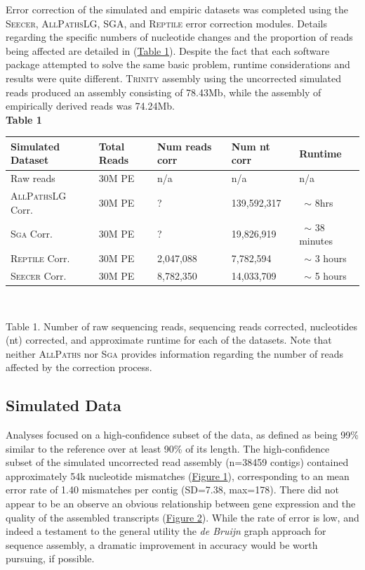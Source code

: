 \documentclass[11pt]{article}
\begin{document}
\noindent
Error correction of the simulated and empiric datasets was completed using the \textsc{Seecer}, \textsc{AllPathsLG}, \textsc{SGA}, and \textsc{Reptile} error correction modules.  Details regarding the specific numbers of nucleotide changes and the proportion of reads being affected are detailed in (\hyperlink{Table 1}{Table 1}). Despite the fact that each software package attempted to solve the same basic problem, runtime considerations and results were quite different. \textsc{Trinity} assembly using the uncorrected simulated reads produced an assembly consisting of 78.43Mb, while the assembly of empirically derived reads was 74.24Mb.  \\

\noindent
\textbf{\hypertarget{Table 1}{Table 1}} \\
\begin{center}
    \begin{tabular}{ | l | l | l  | l | l |}
    \hline
    Simulated Dataset &  Total Reads & Num reads corr & Num  nt corr & Runtime  \\ \hline
    Raw reads & 30M PE & n/a & n/a & n/a \\ \hline
    \textsc{AllPathsLG} Corr. & 30M PE & ? & 139,592,317 & \ $\sim$ 8hrs \\ \hline
    \textsc{Sga} Corr. & 30M PE & ? & 19,826,919 & \ $\sim$ 38 minutes \\ \hline
    \textsc{Reptile} Corr. & 30M PE & 2,047,088 & 7,782,594 & \ $\sim$ 3 hours \\ \hline
     \textsc{Seecer} Corr. & 30M PE & 8,782,350 & 14,033,709 & \ $\sim$ 5 hours \\ \hline
       \end{tabular}
\\
\end{center}
\noindent
\begin{changemargin}{2cm}{2cm}
Table 1. Number of raw sequencing reads, sequencing reads corrected, nucleotides (nt) corrected, and approximate runtime for each of the datasets. Note that neither \textsc{AllPaths} nor \textsc{Sga} provides information regarding the number of reads affected by the correction process. 
\end{changemargin}

\subsection*{Simulated Data}
Analyses focused on a high-confidence subset of the data, as defined as being 99\% similar to the reference over at least 90\% of its length. The high-confidence subset of the simulated uncorrected read assembly (n=38459 contigs) contained approximately 54k nucleotide mismatches (\hyperlink{Figure 1}{Figure 1}), corresponding to an mean error rate of 1.40 mismatches per contig (SD=7.38, max=178).  There did not appear to be an observe an obvious relationship between gene expression and the quality of the assembled transcripts (\hyperlink{Figure 2}{Figure 2}). While the rate of error is low, and indeed a testament to the general utility the \textit{de Bruijn} graph approach for sequence assembly, a dramatic improvement in accuracy would be worth pursuing, if possible.  \\
\end{document}
